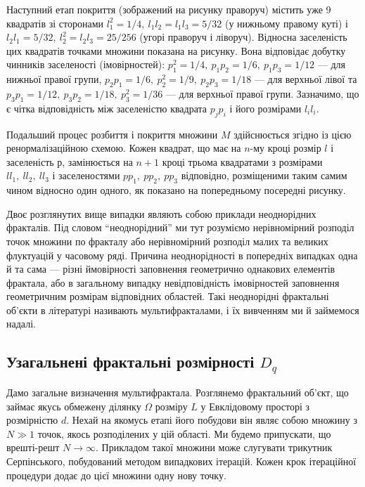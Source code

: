 \documentclass[
  letterpaper,
]{report}
\begin{document}
Наступний етап покриття (зображений на рисунку праворуч) містить уже 9
квадратів зі сторонами \(l_{1}^{2}=1/4, \ l_{1}l_{2}=l_{1}l_{3}=5/32\)
(у нижньому правому куті) і
\(l_{2}l_{1}=5/32, \ l_{2}^{2}=l_{2}l_{3}=25/256\) (угорі праворуч і
ліворуч). Відносна заселеність цих квадратів точками множини показана на
рисунку. Вона відповідає добутку чинників заселеності (імовірностей):
\(p_{1}^{2}=1/4, \ p_{1}p_{2}=1/6, \ p_{1}p_{3}=1/12\) --- для нижньої
правої групи, \(p_{2}p_{1}=1/6, \ p_{2}^{2}=1/9, \ p_{2}p_{3} = 1/18\)
--- для верхньої лівої та
\(p_{3}p_{1}=1/12, \ p_{3}p_{2}=1/18, \ p_{3}^{2}=1/36\) --- для
верхньої правої групи. Зазначимо, що є чітка відповідність між
заселеністю квадрата \(p_{j}p_{i}\) і його розмірами \(l_{i}l_{i}\).

Подальший процес розбиття і покриття множини \(M\) здійснюється згідно
із цією ренормалізаційною схемою. Кожен квадрат, що має на \(n\)-му
кроці розмір \(l\) і заселеність \(р\), замінюється на \(n+1\) кроці
трьома квадратами з розмірами \(ll_{1}, \ ll_{2}, \ ll_{3}\) і
заселеностями \(pp_{1}, \ pp_{2}, \ pp_{3}\) відповідно, розміщеними
таким самим чином відносно один одного, як показано на попередньому
посередні рисунку.

Двоє розглянутих вище випадки являють собою приклади неоднорідних
фракталів. Під словом ``неоднорідний'' ми тут розуміємо нерівномірний
розподіл точок множини по фракталу або нерівномірний розподіл малих та
великих флуктуацій у часовому ряді. Причина неоднорідності в попередніх
випадках одна й та сама --- різні ймовірності заповнення геометрично
однакових елементів фрактала, або в загальному випадку невідповідність
імовірностей заповнення геометричним розмірам відповідних областей. Такі
неоднорідні фрактальні об'єкти в літературі називають мультифракталами,
і їх вивченням ми й займемося надалі.

\hypertarget{ux443ux437ux430ux433ux430ux43bux44cux43dux435ux43dux456-ux444ux440ux430ux43aux442ux430ux43bux44cux43dux456-ux440ux43eux437ux43cux456ux440ux43dux43eux441ux442ux456-d_q}{%
\subsection{\texorpdfstring{Узагальнені фрактальні розмірності
\(D_{q}\)}{Узагальнені фрактальні розмірності D\_\{q\}}}\label{ux443ux437ux430ux433ux430ux43bux44cux43dux435ux43dux456-ux444ux440ux430ux43aux442ux430ux43bux44cux43dux456-ux440ux43eux437ux43cux456ux440ux43dux43eux441ux442ux456-d_q}}

Дамо загальне визначення мультифрактала. Розглянемо фрактальний об'єкт,
що займає якусь обмежену ділянку \(\Omega\) розміру \(L\) у Евклідовому
просторі з розмірністю \(d\). Нехай на якомусь етапі його побудови він
являє собою множину з \(N \gg 1\) точок, якось розподілених у цій
області. Ми будемо припускати, що врешті-решт \(N \to \infty\).
Прикладом такої множини може слугувати трикутник Серпінського,
побудований методом випадкових ітерацій. Кожен крок ітераційної
процедури додає до цієї множини одну нову точку.
\end{document}
